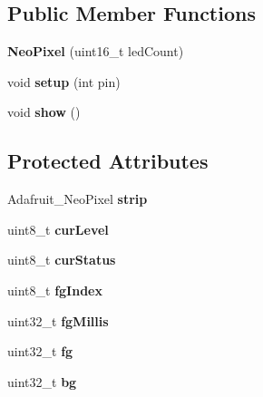 \subsection*{Public Member Functions}
\begin{DoxyCompactItemize}
\item 
\hypertarget{classfirestep_1_1_neo_pixel_af4205fe9853612babdda3db19b7d0b95}{{\bfseries Neo\+Pixel} (uint16\+\_\+t led\+Count)}\label{classfirestep_1_1_neo_pixel_af4205fe9853612babdda3db19b7d0b95}

\item 
\hypertarget{classfirestep_1_1_neo_pixel_aef35dca3b6a1cf79a7c8cad2010600d5}{void {\bfseries setup} (int pin)}\label{classfirestep_1_1_neo_pixel_aef35dca3b6a1cf79a7c8cad2010600d5}

\item 
\hypertarget{classfirestep_1_1_neo_pixel_a56ef3d39dfee07f276165f38569087b0}{void {\bfseries show} ()}\label{classfirestep_1_1_neo_pixel_a56ef3d39dfee07f276165f38569087b0}

\end{DoxyCompactItemize}
\subsection*{Protected Attributes}
\begin{DoxyCompactItemize}
\item 
\hypertarget{classfirestep_1_1_neo_pixel_a42ac6f7e29d6579ee6c9b3b2c36cc38e}{Adafruit\+\_\+\+Neo\+Pixel {\bfseries strip}}\label{classfirestep_1_1_neo_pixel_a42ac6f7e29d6579ee6c9b3b2c36cc38e}

\item 
\hypertarget{classfirestep_1_1_neo_pixel_a20e98401689568572b8f7a4fafdcdd12}{uint8\+\_\+t {\bfseries cur\+Level}}\label{classfirestep_1_1_neo_pixel_a20e98401689568572b8f7a4fafdcdd12}

\item 
\hypertarget{classfirestep_1_1_neo_pixel_ad1f830a67f5de8e6ec7bc800f8494805}{uint8\+\_\+t {\bfseries cur\+Status}}\label{classfirestep_1_1_neo_pixel_ad1f830a67f5de8e6ec7bc800f8494805}

\item 
\hypertarget{classfirestep_1_1_neo_pixel_acafe96dea7f2f5e9d7d8ee14109923be}{uint8\+\_\+t {\bfseries fg\+Index}}\label{classfirestep_1_1_neo_pixel_acafe96dea7f2f5e9d7d8ee14109923be}

\item 
\hypertarget{classfirestep_1_1_neo_pixel_a668b995080132555a333b4628e9a615f}{uint32\+\_\+t {\bfseries fg\+Millis}}\label{classfirestep_1_1_neo_pixel_a668b995080132555a333b4628e9a615f}

\item 
\hypertarget{classfirestep_1_1_neo_pixel_a77bf9d6ccf80f93bda14bf42cd59c943}{uint32\+\_\+t {\bfseries fg}}\label{classfirestep_1_1_neo_pixel_a77bf9d6ccf80f93bda14bf42cd59c943}

\item 
\hypertarget{classfirestep_1_1_neo_pixel_a234897f0de7c449f81cef5f75f76eec5}{uint32\+\_\+t {\bfseries bg}}\label{classfirestep_1_1_neo_pixel_a234897f0de7c449f81cef5f75f76eec5}

\end{DoxyCompactItemize}


